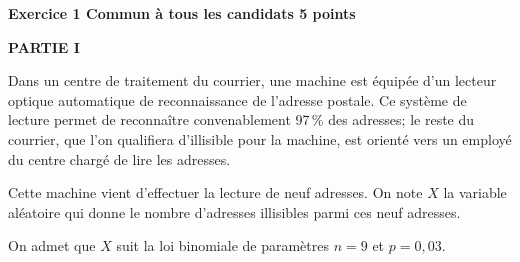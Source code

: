 \textbf{\large Exercice 1 \hfill Commun à  tous les candidats \hfill 5 points}

\medskip

%

\textbf{PARTIE I}

\medskip

Dans un centre de traitement du courrier, une machine est équipée d'un lecteur optique automatique de reconnaissance de l'adresse postale. Ce système de lecture permet de reconnaître convenablement 97\,\% des adresses; le reste du courrier, que l'on qualifiera d'illisible pour la machine, est orienté vers un employé du centre chargé de lire les adresses. 

Cette machine vient d'effectuer la lecture de neuf adresses. On note $X$ la variable aléatoire qui donne le nombre d'adresses illisibles parmi ces neuf adresses.

On admet que $X$ suit la loi binomiale de paramètres $n = 9$ et $p = 0,03$.

\medskip

